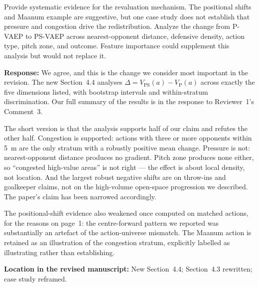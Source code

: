 \documentclass[11pt,a4paper]{article}
\newcommand{\response}[2]{%
  \begin{responsebox}
  \textbf{Response:}
  #1
  \end{responsebox}
  \begin{locationbox}
  \textbf{Location in the revised manuscript:}
  #2
  \end{locationbox}
}
\begin{document}
\begin{reviewbox}
Provide systematic evidence for the revaluation mechanism. The positional shifts and Maanum example are suggestive, but one case study does not establish that pressure and congestion drive the redistribution. Analyze the change from P-VAEP to PS-VAEP across nearest-opponent distance, defensive density, action type, pitch zone, and outcome. Feature importance could supplement this analysis but would not replace it.
\end{reviewbox}
\response{We agree, and this is the change we consider most important in the revision. The new Section~4.4 analyses $\Delta = V_{\mathrm{PS}}(a) - V_{\mathrm{P}}(a)$ across exactly the five dimensions listed, with bootstrap intervals and within-stratum discrimination. Our full summary of the results is in the response to Reviewer~1's Comment~3.

The short version is that the analysis supports half of our claim and refutes the other half. Congestion is supported: actions with three or more opponents within 5~m are the only stratum with a robustly positive mean change. Pressure is not: nearest-opponent distance produces no gradient. Pitch zone produces none either, so ``congested high-value areas'' is not right --- the effect is about local density, not location. And the largest robust negative shifts are on throw-ins and goalkeeper claims, not on the high-volume open-space progression we described. The paper's claim has been narrowed accordingly.

The positional-shift evidence also weakened once computed on matched actions, for the reasons on page~1: the centre-forward pattern we reported was substantially an artefact of the action-universe mismatch. The Maanum action is retained as an illustration of the congestion stratum, explicitly labelled as illustrating rather than establishing.}{New Section~4.4; Section~4.3 rewritten; case study reframed.}
\end{document}
